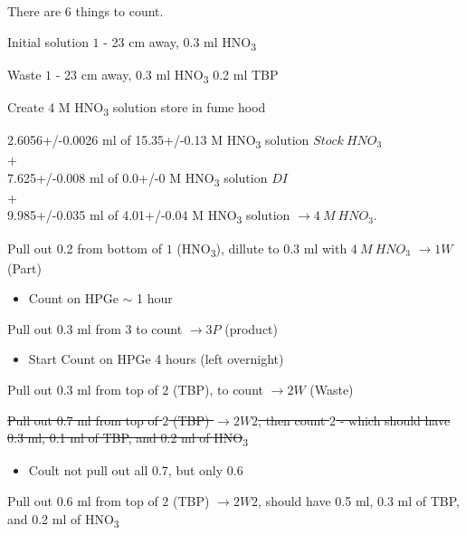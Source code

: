 \documentclass[idxtotoc,hyperref,openany,oneside]{labbook} %
\newcommand{\cmark}{\ding{51}}%
\newcommand{\done}{\rlap{$\square$}{\raisebox{2pt}{\large\hspace{1pt}\cmark}}%
  \hspace{-2.5pt}}
\newcommand{\tsbs}{\textsubscript}
\begin{document}


There are 6 things to count.
\begin{todolist}
\item[\done]{Initial solution $\boxed{1}$ - 23 cm away, 0.3 ml HNO\tsbs{3}}
\item[\done]{Waste $\boxed{1}$ - 23 cm away, 0.3 ml HNO\tsbs{3} 0.2 ml TBP}
\item[\done]{Create 4 M HNO\tsbs{3} solution store in fume hood}
\end{todolist}
\begin{center}
2.6056+/-0.0026 ml of 15.35+/-0.13 M HNO\tsbs{3} solution $\boxed{Stock\ HNO_3}$\\
+\\
7.625+/-0.008 ml of 0.0+/-0 M HNO\tsbs{3} solution $\boxed{DI}$\\
+\\
9.985+/-0.035 ml of 4.01+/-0.04 M HNO\tsbs{3} solution $\boxed{\rightarrow 4\ M\ HNO_3}$.
\end{center}
\begin{todolist}
\item[\done]{Pull out 0.2 from bottom of $\boxed{1}$ (HNO\tsbs{3}),
  dillute to 0.3 ml with $\boxed{4\ M\ HNO_3}$ $\boxed{\rightarrow 1W}$ (Part)}
  \begin{itemize}
  \item{Count on HPGe $\sim$ 1 hour}
  \end{itemize}
\item[\done]{Pull out 0.3 ml from $\boxed{3}$ to count
  $\boxed{\rightarrow 3P}$ (product)}
  \begin{itemize}
  \item{Start Count on HPGe 4 hours (left overnight)}
  \end{itemize}
\item[\done]{Pull out 0.3 ml from top of $\boxed{2}$ (TBP), to count
       $\boxed{\rightarrow 2W}$ (Waste)}
\item{\st{Pull out 0.7 ml from top of $\boxed{2}$ (TBP)
  $\boxed{\rightarrow 2W2}$, then count $\boxed{2}$ - which should
    have 0.3 ml, 0.1 ml of TBP, and 0.2 ml of HNO}\tsbs{3}}
  \begin{itemize}
  \item{Coult not pull out all 0.7, but only 0.6}
  \end{itemize}
\item[\done]{Pull out 0.6 ml from top of $\boxed{2}$ (TBP)
  $\boxed{\rightarrow 2W2}$, should have 0.5 ml, 0.3 ml of TBP,
  and 0.2 ml of HNO\tsbs{3}}
\end{todolist}
\end{document}

